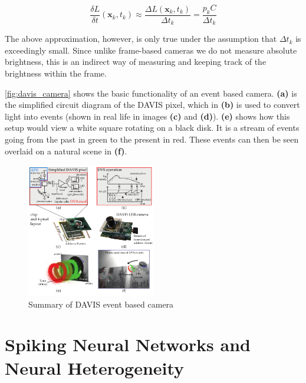 \begin{equation}
      \frac{\delta L}{\delta t}(\boldsymbol{\mathbf{x}}_k, t_k) \approx \frac{\Delta L(\boldsymbol{\mathbf{x}}_k, t_k)}{\Delta t_k} = \frac{p_k C}{\Delta t_k}
      \label{eq:temporal_derivative}
\end{equation}

The above approximation, however, is only true under the assumption that $ \Delta t_k $ is exceedingly small. Since unlike frame-based cameras we do not measure absolute brightness, this is an indirect way of measuring and keeping track of the brightness within the frame.

\autoref{fig:davis_camera} shows the basic functionality of an event based camera. \textbf{(a)} is the simplified circuit diagram of the DAVIS pixel, which in \textbf{(b)} is used to convert light into events (shown in real life in images \textbf{(c)} and \textbf{(d)}). \textbf{(e)} shows how this setup would view a white square rotating on a black disk. It is a stream of events going from the past in green to the present in red. These events can then be seen overlaid on a natural scene in \textbf{(f)}.

\begin{figure}[htb]
      \centering
      \includegraphics[width=0.5\textwidth]{background/images/davis_camera.png}
      \caption{Summary of DAVIS event based camera\cite{EventBasedVisionASurvery}}
      \label{fig:davis_camera}
\end{figure}

\section{Spiking Neural Networks and Neural Heterogeneity}

